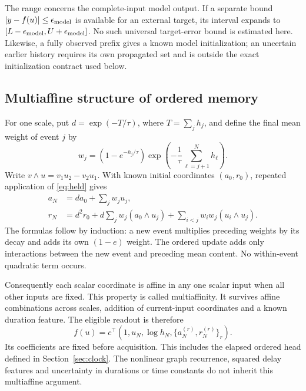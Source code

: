\documentclass[11pt,a4paper]{article}
\theoremstyle{definition}\newtheorem{definition}[theorem]{Definition}
\begin{document}
The range concerns the complete-input model output. If a separate bound $|y-f(u)|\leq\epsilon_{\rm model}$ is available for an external target, its interval expands to $[L-\epsilon_{\rm model},U+\epsilon_{\rm model}]$. No such universal target-error bound is estimated here. Likewise, a fully observed prefix gives a known model initialization; an uncertain earlier history requires its own propagated set and is outside the exact initialization contract used below.

\subsection{Multiaffine structure of ordered memory}
For one scale, put $d=\exp(-T/\tau)$, where $T=\sum_j h_j$, and define the final mean weight of event $j$ by
\begin{equation}
 w_j=(1-e^{-h_j/\tau})\exp\left(-\frac1\tau\sum_{\ell=j+1}^{N}h_\ell\right).
\end{equation}
Write $v\wedge u=v_1u_2-v_2u_1$. With known initial coordinates $(a_0,r_0)$, repeated application of \eqref{eq:held} gives
\begin{align}
 a_N&=d a_0+\sum_jw_ju_j,\label{eq:weightedmean}\\
 r_N&=d^2r_0+d\sum_j w_j(a_0\wedge u_j)
       +\sum_{i<j}w_iw_j(u_i\wedge u_j).\label{eq:weightedorder}
\end{align}
The formulas follow by induction: a new event multiplies preceding weights by its decay and adds its own $(1-e)$ weight. The ordered update adds only interactions between the new event and preceding mean content. No within-event quadratic term occurs.

Consequently each scalar coordinate is affine in any one scalar input when all other inputs are fixed. This property is called multiaffinity. It survives affine combinations across scales, addition of current-input coordinates and a known duration feature. The eligible readout is therefore
\begin{equation}
 f(u)=c^\top(1,u_N,\log h_N,\{a_N^{(r)},r_N^{(r)}\}_r).\label{eq:auditedhead}
\end{equation}
Its coefficients are fixed before acquisition. This includes the elapsed ordered head defined in Section~\ref{sec:clock}. The nonlinear graph recurrence, squared delay features and uncertainty in durations or time constants do not inherit this multiaffine argument.
\end{document}
